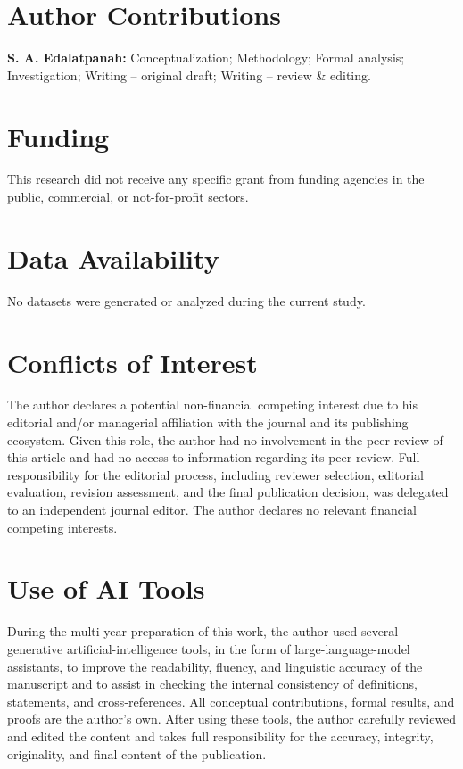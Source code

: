 \documentclass[reqno,final]{amsart}
\theoremstyle{definition}
\theoremstyle{plain}
\theoremstyle{remark}
\begin{document}
\section*{Author Contributions}
\textbf{S. A. Edalatpanah:}
Conceptualization; Methodology; Formal analysis;
Investigation; Writing -- original draft;
Writing -- review \& editing.

\section*{Funding}
This research did not receive any specific grant from funding agencies in the public, commercial, or not-for-profit sectors.

\section*{Data Availability}
No datasets were generated or analyzed during the current study.

\section*{Conflicts of Interest}
The author declares a potential non-financial competing interest due to his editorial and/or managerial affiliation with the journal and its publishing ecosystem. Given this role, the author had no involvement in the peer-review of this article and had no access to information regarding its peer review. Full responsibility for the editorial process, including reviewer selection, editorial evaluation, revision assessment, and the final publication decision, was delegated to an independent journal editor. The author declares no relevant financial competing interests.

\section*{Use of AI Tools}
During the multi-year preparation of this work, the author used several generative artificial-intelligence tools, in the form of large-language-model assistants, to improve the readability, fluency, and linguistic accuracy of the manuscript and to assist in checking the internal consistency of definitions, statements, and cross-references. All conceptual contributions, formal results, and proofs are the author's own. After using these tools, the author carefully reviewed and edited the content and takes full responsibility for the accuracy, integrity, originality, and final content of the publication.
\end{document}
